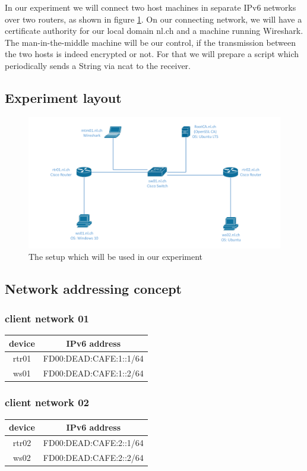 \documentclass[a4paper]{report}
\begin{document}
In our experiment we will connect two host machines in separate IPv6 networks over two routers, as shown in figure \ref{fig:exp_layout}. On our connecting network, we will have a certificate authority for our local domain nl.ch and a machine running Wireshark. The man-in-the-middle machine will be our control, if the transmission between the two hosts is indeed encrypted or not. For that we will prepare a script which periodically sends a String via ncat to the receiver.

\subsection{Experiment layout}
\label{ssec:ExpLayout}

\begin{figure}[htb]
	\includegraphics[keepaspectratio, width = \linewidth]{experiment_layout}
	\caption{The setup which will be used in our experiment}
	\label{fig:exp_layout}
\end{figure}

\subsection{Network addressing concept}
\subsubsection{client network 01}
\begin{tabular}{|c|c|}
	\hline 
	\textbf{device} & \textbf{IPv6 address} \\ 
	\hline 
	rtr01 & FD00:DEAD:CAFE:1::1/64 \\ 
	\hline 
	ws01 & FD00:DEAD:CAFE:1::2/64 \\ 
	\hline 
\end{tabular} 

\subsubsection{client network 02}
\begin{tabular}{|c|c|}
	\hline 
	\textbf{device} & \textbf{IPv6 address} \\ 
	\hline 
	rtr02 & FD00:DEAD:CAFE:2::1/64 \\ 
	\hline 
	ws02 & FD00:DEAD:CAFE:2::2/64 \\ 
	\hline 
\end{tabular} 
\end{document}
